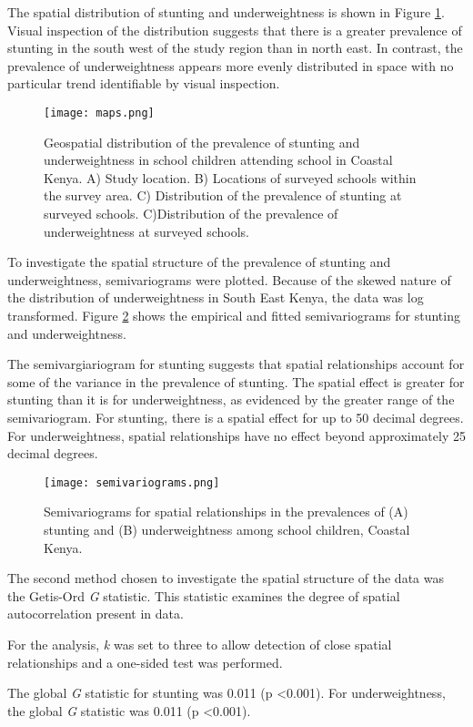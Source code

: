 \documentclass[11pt,a4paper,twoside]{article}\usepackage[]{graphicx}\usepackage[]{color}
\begin{document}
The spatial distribution of stunting and underweightness is shown in Figure \ref{dist_maps}. 
Visual inspection of the distribution suggests that there is a greater prevalence of stunting in the south west of the study region than in north east. 
In contrast, the prevalence of underweightness appears more evenly distributed in space with no particular trend identifiable by visual inspection. 
\begin{figure}[b]
\texttt{[image: maps.png]}
\caption{Geospatial distribution of the prevalence of stunting and underweightness in school children attending school in Coastal Kenya. A) Study location. B) Locations of surveyed schools within the survey area. C) Distribution of the prevalence of stunting at surveyed schools. C)Distribution of the prevalence of underweightness at surveyed schools.}
\label{dist_maps}
\end{figure}

To investigate the spatial structure of the prevalence of stunting and underweightness, semivariograms were plotted. 
Because of the skewed nature of the distribution of underweightness in South East Kenya, the data was log transformed. 
Figure \ref{semi} shows the empirical and fitted semivariograms for stunting and underweightness. 

The semivargiariogram for stunting suggests that spatial relationships account for some of the variance in the prevalence of stunting. 
The spatial effect is greater for stunting than it is for underweightness, as evidenced by the greater range of the semivariogram. 
For stunting, there is a spatial effect for up to 50 decimal degrees. 
For underweightness, spatial relationships have no effect beyond approximately 25 decimal degrees. 
\begin{figure}[b]
\texttt{[image: semivariograms.png]}
\caption{Semivariograms for spatial relationships in the prevalences of (A) stunting  and (B) underweightness among school children, Coastal Kenya.}
\label{semi}
\end{figure}

The second method chosen to investigate the spatial structure of the data was the Getis-Ord  \textit{G} statistic. 
This statistic examines the degree of spatial autocorrelation present in data. 

For the analysis, \textit{k} was set to three to allow detection of close spatial relationships and a one-sided test was performed.


The global \textit{G} statistic for stunting was 0.011 (p \textless 0.001).
For underweightness, the global \textit{G} statistic was 0.011 (p \textless 0.001).
\end{document}
